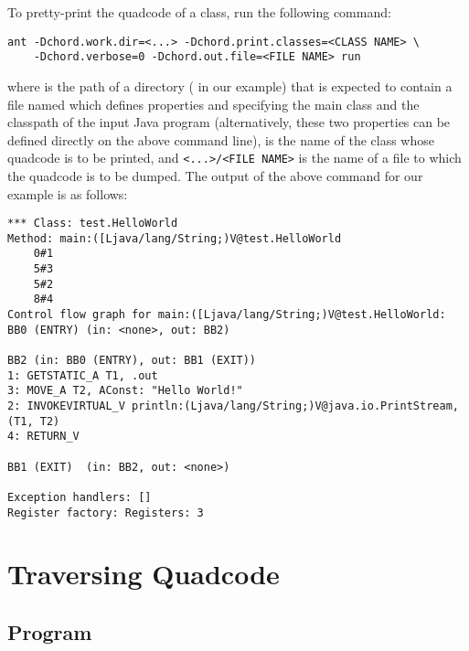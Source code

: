 To pretty-print the quadcode of a class, run the following command:

\begin{framed}
\begin{verbatim}
ant -Dchord.work.dir=<...> -Dchord.print.classes=<CLASS NAME> \
    -Dchord.verbose=0 -Dchord.out.file=<FILE NAME> run
\end{verbatim}
\end{framed}

where  is the path of a directory
( in our example) that is expected to
contain a file named \code{chord.properties} which defines
properties  and 
specifying the main class and the classpath of the input Java program
(alternatively, these two properties can be defined directly on the
above command line), {\tt <CLASS NAME>} is the name of the class whose
quadcode is to be printed, and {\tt <...>/<FILE NAME>} is the name of
a file to which the quadcode is to be dumped.  The output of the above
command for our example is as follows:

\begin{framed}
\begin{verbatim}
*** Class: test.HelloWorld
Method: main:([Ljava/lang/String;)V@test.HelloWorld
    0#1
    5#3
    5#2
    8#4
Control flow graph for main:([Ljava/lang/String;)V@test.HelloWorld:
BB0 (ENTRY) (in: <none>, out: BB2)

BB2 (in: BB0 (ENTRY), out: BB1 (EXIT))
1: GETSTATIC_A T1, .out
3: MOVE_A T2, AConst: "Hello World!"
2: INVOKEVIRTUAL_V println:(Ljava/lang/String;)V@java.io.PrintStream, (T1, T2)
4: RETURN_V

BB1 (EXIT)  (in: BB2, out: <none>)

Exception handlers: []
Register factory: Registers: 3
\end{verbatim}
\end{framed}

\section{Traversing Quadcode}

\subsection{Program}

